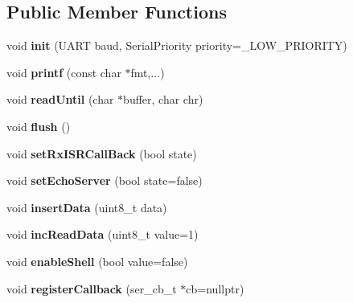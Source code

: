 \subsection*{Public Member Functions}
\begin{DoxyCompactItemize}
\item 
\mbox{\label{classSerial_ab84837438196db931f7cb9f73f14a343}} 
void {\bfseries init} (U\+A\+RT baud, Serial\+Priority priority=\+\_\+\+L\+O\+W\+\_\+\+P\+R\+I\+O\+R\+I\+TY)
\item 
\mbox{\label{classSerial_a4c0b18b5cff99f166aed20fa8295ccf9}} 
void {\bfseries printf} (const char $\ast$fmt,...)
\item 
\mbox{\label{classSerial_aba74e314aa15524ce7cd49306accc666}} 
void {\bfseries read\+Until} (char $\ast$buffer, char chr)
\item 
\mbox{\label{classSerial_a63b7abf172cad25bfc998b3b1f98310f}} 
void {\bfseries flush} ()
\item 
\mbox{\label{classSerial_aac4dc5a6eb54ac09c3813684295f00f4}} 
void {\bfseries set\+Rx\+I\+S\+R\+Call\+Back} (bool state)
\item 
\mbox{\label{classSerial_aca6f48464bb0a4828177f0c70111a36a}} 
void {\bfseries set\+Echo\+Server} (bool state=false)
\item 
\mbox{\label{classSerial_ad805c3cc6c46156d640f34eac1585d4a}} 
void {\bfseries insert\+Data} (uint8\+\_\+t data)
\item 
\mbox{\label{classSerial_a54041d1af51695205e804dfc911983da}} 
void {\bfseries inc\+Read\+Data} (uint8\+\_\+t value=1)
\item 
\mbox{\label{classSerial_ab8ff24beb4593dd912b8091099a6ebd4}} 
void {\bfseries enable\+Shell} (bool value=false)
\item 
\mbox{\label{classSerial_a2e870d7b7fcab20cc2d2fb70ad73764d}} 
void {\bfseries register\+Callback} (ser\+\_\+cb\+\_\+t $\ast$cb=nullptr)
\item 
\mbox{\label{classSerial_a2485ab59468bc39160fa72ba9a22c784}} 

\end{DoxyCompactItemize}
